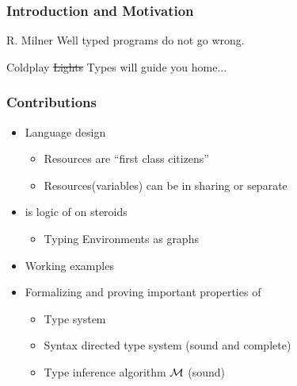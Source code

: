 \begin{frame}[c]
  \frametitle{Introduction and Motivation}
  \begin{center}
    \uncover<+-> {\LARGE
      \begin{aquote}{R. Milner}
        Well typed programs do not go wrong.
      \end{aquote}
    }
    \vspace{2cm}
    \uncover<+-> {\LARGE
      \begin{aquote}{Coldplay}
        \sout{Lights}{\color{red} Types} will guide you home$\dots$
      \end{aquote}
    }
  \end{center}
\end{frame}

\begin{frame}
  \frametitle{Contributions}

  \begin{itemize}

  \item {\color{red}Language design}
    \begin{itemize}
    \item {\color{red}Resources are ``first class citizens''}
    \item {\color{red}Resources(variables) can be in sharing or separate}
    \end{itemize}

  \item {\color{red}\qub{} is logic of \BI on steroids}
    \begin{itemize}
    \item {\color{red}Typing Environments as graphs}
    \end{itemize}
  \item {\color{red}Working examples}
  \item Formalizing and proving important properties of \qub{}
    \begin{itemize}
    \item Type system
    \item Syntax directed type system (sound and complete)
    \item Type inference algorithm $\mathcal{M}$ (sound)
    \end{itemize}

  \end{itemize}

\end{frame}


